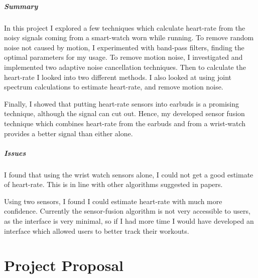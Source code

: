 \documentclass[12pt,a4paper,twoside,openright]{report}
\begin{document}
\paragraph{Summary}

In this project I explored a few techniques which calculate heart-rate from
the noisy signals coming from a smart-watch worn while running. To remove
random noise not caused by motion, I experimented with band-pass filters,
finding the optimal parameters for my usage. To remove motion noise, I
investigated and implemented two adaptive noise cancellation techniques. Then
to calculate the heart-rate I looked into two different methods. I also
looked at using joint spectrum calculations to estimate heart-rate, and remove
motion noise.

Finally, I showed that putting heart-rate sensors into earbuds is a promising
technique, although the signal can cut out. Hence, my developed sensor fusion
technique which combines heart-rate from the earbuds and from a wrist-watch
provides a better signal than either alone.

\paragraph{Issues}

I found that using the wrist watch sensors alone, I could not get a 
good estimate of heart-rate. This is in line with other algorithms suggested
in papers.

Using two sensors, I found I could estimate heart-rate with much more
confidence. Currently the sensor-fusion algorithm is not very accessible to
users, as the interface is very minimal, so if I had more time I would have
developed an interface which allowed users to better track their workouts.




\appendix

%
%
%

\chapter{Project Proposal}


\end{document}
